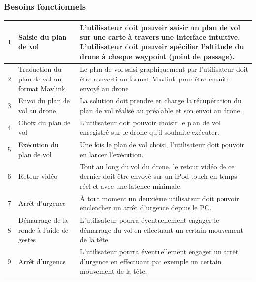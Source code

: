 \documentclass{article}
\begin{document}
\subsubsection{Besoins fonctionnels}
	    \begin{center}
	    \vspace*{0.7cm}
        \begin{tabularx}{15cm}{|c|p{4cm}|X|}
            \hline
            1 & Saisie du plan de vol & L'utilisateur doit pouvoir saisir un plan de vol sur une carte à travers une interface intuitive. L'utilisateur doit pouvoir spécifier l'altitude du drone à chaque waypoint (point de passage).\\
            \hline
            2 & Traduction du plan de vol au format Mavlink & Le plan de vol saisi graphiquement par l'utilisateur doit être converti au format Mavlink pour être ensuite envoyé au drone.\\
            \hline
            3 & Envoi du plan de vol au drone & La solution doit prendre en charge la récupération du plan de vol réalisé au préalable et son envoi au drone. \\
            \hline
            4 & Choix du plan de vol  & L'utilisateur doit pouvoir choisir le plan de vol enregistré sur le drone qu'il souhaite exécuter. \\
            \hline
            5 & Exécution du plan de vol  & Une fois le plan de vol choisi, l'utilisateur doit pouvoir en lancer l'exécution. \\
            \hline
            6 & Retour vidéo  & Tout au long du vol du drone, le retour vidéo de ce dernier doit être envoyé sur un iPod touch en temps réel et avec une latence minimale. \\
            \hline
            7 & Arrêt d'urgence  & À tout moment un deuxième utilisateur doit pouvoir enclencher un arrêt d'urgence depuis le PC. \\
            \hline
            8 & Démarrage de la ronde à l'aide de gestes & L'utilisateur pourra éventuellement engager le démarrage du vol en effectuant un certain mouvement de la tête. 	\\
			\hline
			9 & Arrêt d'urgence & L'utilisateur pourra éventuellement engager un arrêt d'urgence en effectuant par exemple un certain mouvement de la tête. 	\\
			\hline
        \end{tabularx}
        \end{center}
        
\end{document}
